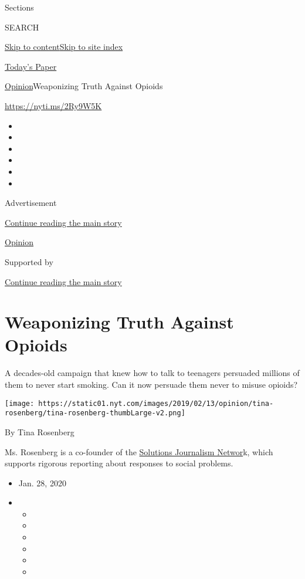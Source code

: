 Sections

SEARCH

\protect\hyperlink{site-content}{Skip to
content}\protect\hyperlink{site-index}{Skip to site index}

\href{https://myaccount.nytimes.com/auth/login?response_type=cookie\&client_id=vi}{}

\href{https://www.nytimes.com/section/todayspaper}{Today's Paper}

\href{/section/opinion}{Opinion}\textbar{}Weaponizing Truth Against
Opioids

\href{https://nyti.ms/2Ry9W5K}{https://nyti.ms/2Ry9W5K}

\begin{itemize}
\item
\item
\item
\item
\item
\item
\end{itemize}

Advertisement

\protect\hyperlink{after-top}{Continue reading the main story}

\href{/section/opinion}{Opinion}

Supported by

\protect\hyperlink{after-sponsor}{Continue reading the main story}

\hypertarget{weaponizing-truth-against-opioids}{%
\section{Weaponizing Truth Against
Opioids}\label{weaponizing-truth-against-opioids}}

A decades-old campaign that knew how to talk to teenagers persuaded
millions of them to never start smoking. Can it now persuade them never
to misuse opioids?

\texttt{[image: https://static01.nyt.com/images/2019/02/13/opinion/tina-rosenberg/tina-rosenberg-thumbLarge-v2.png]}

By Tina Rosenberg

Ms. Rosenberg is a co-founder of the
\href{http://solutionsjournalism.org}{Solutions Journalism Networ}k,
which supports rigorous reporting about responses to social problems.

\begin{itemize}
\item
  Jan. 28, 2020
\item
  \begin{itemize}
  \item
  \item
  \item
  \item
  \item
  \item
  \end{itemize}
\end{itemize}

